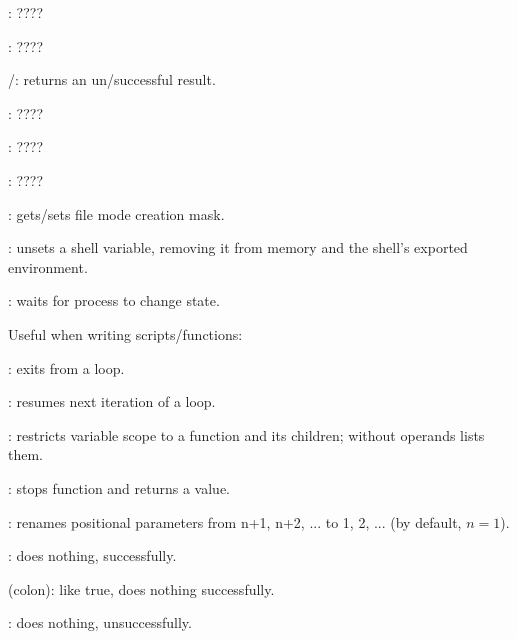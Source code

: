 \begin{compactenum}
\item [\symbolbash] : \dotfill ????

\item [\symbolbash] : \dotfill ????

\item [\symbolbash] /: returns an un/successful result.

\item [\symbolbash] : \dotfill ????

\item [\symbolbash] : \dotfill ????

\item [\symbolbash] : \dotfill ????

\item [\symbolbash] : gets/sets file mode creation mask.


\item [\symbolbash] : unsets a shell variable, removing it from memory and the shell's exported environment.

\item [\symbolbash] : waits for process to change state.
\end{compactenum}

Useful when writing scripts/functions:

\begin{compactenum}
\item [\symbolbash] : exits from a loop.
\item [\symbolbash] : resumes next iteration of a loop.

\item [\symbolbash] : restricts variable scope to a function and its children; without operands lists them.

\item [\symbolbash] : stops function and returns a value.

\item [\symbolbash] : renames positional parameters from n+1, n+2, ... to 1, 2, ... (by default, $n = 1$).

\item [\symbolbash] : does nothing, successfully.
\item [\symbolbash] \commandbash{:} (colon): like true, does nothing successfully.
\item [\symbolbash] : does nothing, unsuccessfully.
\end{compactenum}

%